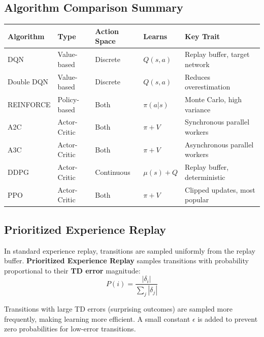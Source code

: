 \documentclass[11pt,a4paper]{article}
\begin{document}
\subsection{Algorithm Comparison Summary}

\begin{center}
\begin{tabular}{|l|l|l|l|l|}
\hline
\textbf{Algorithm} & \textbf{Type} & \textbf{Action Space} & \textbf{Learns} & \textbf{Key Trait} \\ \hline
DQN & Value-based & Discrete & $Q(s,a)$ & Replay buffer, target network \\ \hline
Double DQN & Value-based & Discrete & $Q(s,a)$ & Reduces overestimation \\ \hline
REINFORCE & Policy-based & Both & $\pi(a|s)$ & Monte Carlo, high variance \\ \hline
A2C & Actor-Critic & Both & $\pi + V$ & Synchronous parallel workers \\ \hline
A3C & Actor-Critic & Both & $\pi + V$ & Asynchronous parallel workers \\ \hline
DDPG & Actor-Critic & Continuous & $\mu(s) + Q$ & Replay buffer, deterministic \\ \hline
PPO & Actor-Critic & Both & $\pi + V$ & Clipped updates, most popular \\ \hline
\end{tabular}
\end{center}

\subsection{Prioritized Experience Replay}

In standard experience replay, transitions are sampled uniformly from the replay buffer. \textbf{Prioritized Experience Replay} samples transitions with probability proportional to their \textbf{TD error} magnitude:
\[
P(i) = \frac{|\delta_i|}{\sum_j |\delta_j|}
\]

Transitions with large TD errors (surprising outcomes) are sampled more frequently, making learning more efficient. A small constant $\epsilon$ is added to prevent zero probabilities for low-error transitions.
\end{document}
